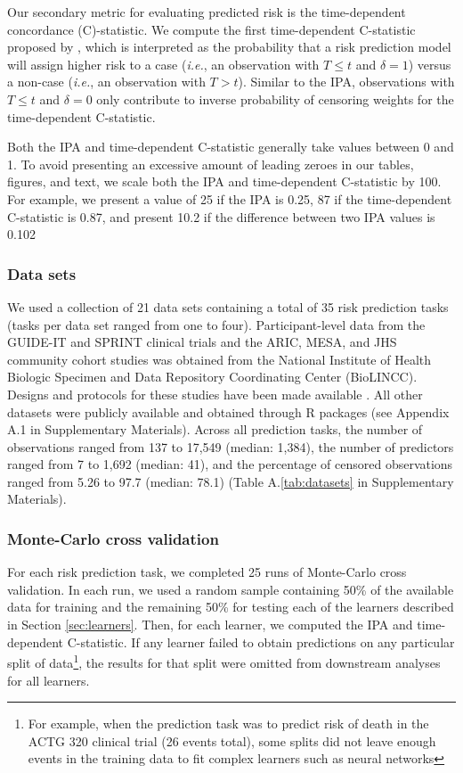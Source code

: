\documentclass[12pt]{article}\usepackage[]{graphicx}\usepackage[]{xcolor}
\newcommand{\ie}{\textit{i.e.}}
\newcommand{\secref}[1]{Section \ref{#1}}
\newcommand{\tabrefAppendix}[1]{Table A.\ref{#1}}
\begin{document}
Our secondary metric for evaluating predicted risk is the time-dependent concordance (C)-statistic. We compute the first time-dependent C-statistic proposed by \citet[][Equation~3]{blanche2013estimating}, which is interpreted as the probability that a risk prediction model will assign higher risk to a case (\ie, an observation with $T \leq t$ and $\delta = 1$) versus a non-case (\ie, an observation with $T > t$). Similar to the IPA, observations with $T \leq t$ and $\delta = 0$ only contribute to inverse probability of censoring weights for the time-dependent C-statistic.

Both the IPA and time-dependent C-statistic generally take values between 0 and 1. To avoid presenting an excessive amount of leading zeroes in our tables, figures, and text, we scale both the IPA and time-dependent C-statistic by 100. For example, we present a value of 25 if the IPA is 0.25, 87 if the time-dependent C-statistic is 0.87, and present 10.2 if the difference between two IPA values is 0.102

\subsubsection{Data sets}

We used a collection of 21 data sets containing a total of 35 risk prediction tasks (tasks per data set ranged from one to four). Participant-level data from the GUIDE-IT and SPRINT clinical trials and the ARIC, MESA, and JHS community cohort studies was obtained from the National Institute of Health Biologic Specimen and Data Repository Coordinating Center (BioLINCC). Designs and protocols for these studies have been made available \citep{aric1989atherosclerosis, bild2002multi, felker2017effect, sprint2015randomized, taylor2005toward}. All other datasets were publicly available and obtained through R packages (see Appendix A.1 in Supplementary Materials). Across all prediction tasks, the number of observations ranged from 137 to 17,549 (median: 1,384), the number of predictors ranged from 7 to 1,692 (median: 41), and the percentage of censored observations ranged from 5.26 to 97.7 (median: 78.1) (\tabrefAppendix{tab:datasets} in Supplementary Materials).

\subsubsection{Monte-Carlo cross validation}

For each risk prediction task, we completed 25 runs of Monte-Carlo cross validation. In each run, we used a random sample containing 50\% of the available data for training and the remaining 50\% for testing each of the learners described in \secref{sec:learners}. Then, for each learner, we computed the IPA and time-dependent C-statistic. If any learner failed to obtain predictions on any particular split of data\footnote{For example, when the prediction task was to predict risk of death in the ACTG 320 clinical trial (26 events total), some splits did not leave enough events in the training data to fit complex learners such as neural networks}, the results for that split were omitted from downstream analyses for all learners.
\end{document}
